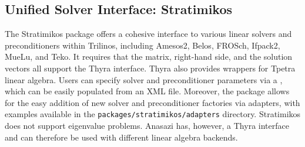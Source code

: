 \subsection{Unified Solver Interface: Stratimikos}
\label{sec:Stratimikos}
The Stratimikos package offers a cohesive interface to various linear solvers and preconditioners within Trilinos, including Amesos2, Belos, FROSch, Ifpack2, MueLu, and Teko.
It requires that the matrix, right-hand side, and the solution vectors all support the Thyra interface.
Thyra also provides wrappers for Tpetra linear algebra.
Users can specify solver and preconditioner parameters via a , which can be easily populated from an XML file.
Moreover, the package allows for the easy addition of new solver and preconditioner factories via adapters, with examples available in the \texttt{packages/stratimikos/adapters} directory.
Stratimikos does not support eigenvalue problems.
Anasazi has, however, a Thyra interface and can therefore be used with different linear algebra backends.
